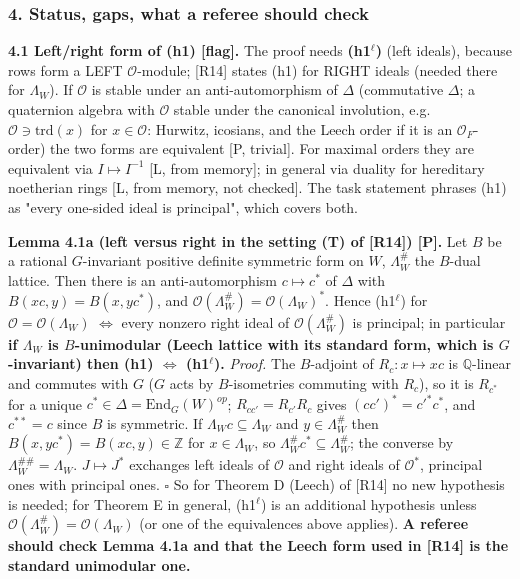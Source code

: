 \hypertarget{status-gaps-what-a-referee-should-check}{%
\subsubsection*{4. Status, gaps, what a referee should check}\label{status-gaps-what-a-referee-should-check}}

\textbf{4.1 Left/right form of (h1) {[}flag{]}.} The proof needs \textbf{(h1\(^\ell\))} (left ideals), because rows form a LEFT \(\mathcal O\)-module; {[}R14{]} states (h1) for RIGHT ideals (needed there for \(\Lambda_W\)). If \(\mathcal O\) is stable under an anti-automorphism of \(\Delta\) (commutative \(\Delta\); a quaternion algebra with \(\mathcal O\) stable under the canonical involution, e.g. \(\mathcal O\ni\mathrm{trd}(x)\) for \(x\in\mathcal O\): Hurwitz, icosians, and the Leech order if it is an \(\mathcal O_F\)-order) the two forms are equivalent {[}P, trivial{]}. For maximal orders they are equivalent via \(I\mapsto I^{-1}\) {[}L, from memory{]}; in general via duality for hereditary noetherian rings {[}L, from memory, not checked{]}. The task statement phrases (h1) as "every one-sided ideal is principal", which covers both.

\textbf{Lemma 4.1a (left versus right in the setting (T) of {[}R14{]}) {[}P{]}.} Let \(B\) be a rational \(G\)-invariant positive definite symmetric form on \(W\), \(\Lambda_W^\#\) the \(B\)-dual lattice. Then there is an anti-automorphism \(c\mapsto c^*\) of \(\Delta\) with \(B(xc,y)=B(x,yc^*)\), and \(\mathcal O(\Lambda_W^\#)=\mathcal O(\Lambda_W)^*\). Hence (h1\(^\ell\)) for \(\mathcal O=\mathcal O(\Lambda_W)\) \(\iff\) every nonzero right ideal of \(\mathcal O(\Lambda_W^\#)\) is principal; in particular \textbf{if \(\Lambda_W\) is \(B\)-unimodular (Leech lattice with its standard form, which is \(G\)-invariant) then (h1) \(\iff\) (h1\(^\ell\)).}
\emph{Proof.} The \(B\)-adjoint of \(R_c:x\mapsto xc\) is \(\mathbb Q\)-linear and commutes with \(G\) (\(G\) acts by \(B\)-isometries commuting with \(R_c\)), so it is \(R_{c^*}\) for a unique \(c^*\in\Delta=\mathrm{End}_G(W)^{op}\); \(R_{cc'}=R_{c'}R_c\) gives \((cc')^*=c'^*c^*\), and \(c^{**}=c\) since \(B\) is symmetric. If \(\Lambda_Wc\subseteq\Lambda_W\) and \(y\in\Lambda_W^\#\) then \(B(x,yc^*)=B(xc,y)\in\mathbb Z\) for \(x\in\Lambda_W\), so \(\Lambda_W^\#c^*\subseteq\Lambda_W^\#\); the converse by \(\Lambda_W^{\#\#}=\Lambda_W\). \(J\mapsto J^*\) exchanges left ideals of \(\mathcal O\) and right ideals of \(\mathcal O^*\), principal ones with principal ones. \(\square\)
So for Theorem D (Leech) of {[}R14{]} no new hypothesis is needed; for Theorem E in general, (h1\(^\ell\)) is an additional hypothesis unless \(\mathcal O(\Lambda_W^\#)=\mathcal O(\Lambda_W)\) (or one of the equivalences above applies). \textbf{A referee should check Lemma 4.1a and that the Leech form used in {[}R14{]} is the standard unimodular one.}

